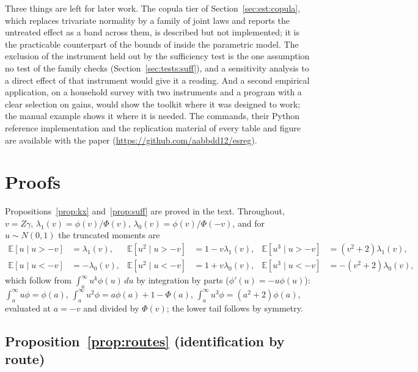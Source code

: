 \documentclass[11pt,a4paper]{article}
\theoremstyle{plain}
\theoremstyle{definition}
\theoremstyle{remark}
\newcommand{\E}{\mathbb{E}}
\newcommand{\1}{\mathbf{1}}
\begin{document}
Three things are left for later work. The copula tier of
Section~\ref{sec:est:copula}, which replaces trivariate normality by a
family of joint laws and reports the untreated effect as a band across
them, is described but not implemented; it is the practicable
counterpart of the bounds of \citet{mogstad2018} inside the parametric
model. The exclusion of the instrument held out by the sufficiency test
is the one assumption no test of the family checks
(Section~\ref{sec:tests:suff}), and a sensitivity analysis to a direct
effect of that instrument would give it a reading. And a second
empirical application, on a household survey with
two instruments and a program with a clear selection on gains, would
show the toolkit where it was designed to work; the manual example
shows it where it is needed. The commands, their Python reference
implementation and the replication material of every table and figure
are available with the paper (\url{https://github.com/aabbdd12/esreg}).

\appendix
\section{Proofs}\label{app:proofs}

Propositions~\ref{prop:kx} and~\ref{prop:suff} are proved in the text.
Throughout, $v=Z\gamma$, $\lambda_1(v)=\phi(v)/\Phi(v)$,
$\lambda_0(v)=\phi(v)/\Phi(-v)$, and for $u\sim N(0,1)$ the truncated
moments are
\begin{equation}\label{eq:trunc}
\begin{aligned}
\E[u\mid u>-v]&=\lambda_1(v), & \E[u^2\mid u>-v]&=1-v\lambda_1(v), & \E[u^3\mid u>-v]&=(v^2+2)\lambda_1(v),\\
\E[u\mid u<-v]&=-\lambda_0(v), & \E[u^2\mid u<-v]&=1+v\lambda_0(v), & \E[u^3\mid u<-v]&=-(v^2+2)\lambda_0(v),
\end{aligned}
\end{equation}
which follow from $\int_a^\infty u^k\phi(u)\,du$ by integration by parts
($\phi'(u)=-u\phi(u)$): $\int_a^\infty u\phi=\phi(a)$,
$\int_a^\infty u^2\phi=a\phi(a)+1-\Phi(a)$,
$\int_a^\infty u^3\phi=(a^2+2)\phi(a)$, evaluated at $a=-v$ and divided
by $\Phi(v)$; the lower tail follows by symmetry.

\subsection{Proposition~\ref{prop:routes} (identification by route)}
\end{document}
